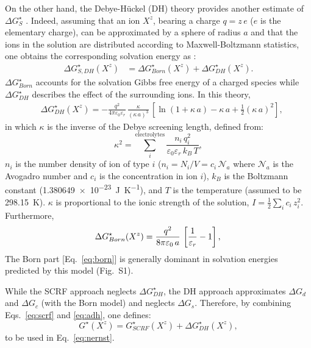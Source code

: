 \documentclass[review,preprint]{elsarticle}
\begin{document}
On the other hand, the Debye-Hückel (DH) theory provides another estimate of $\Delta G_{S}^\star$ \cite{bockrisModernElectrochemistryIonics1998}. Indeed, assuming that an ion $X^z$, bearing a charge $q = z\,e$ ($e$ is the elementary charge), can be approximated by a sphere of radius $a$ and that the ions in the solution are distributed according to Maxwell-Boltzmann statistics, one obtains the corresponding solvation energy as \cite{kontogeorgisDebyeHuckelTheoryIts2018,silvaTrueHuckelEquation2022,silvaImprovingBornEquation2024}:\begin{align}
	\Delta G^\star_{S,DH}(X^z)
	&= \Delta G^\star_{Born}(X^z) + \Delta G^\star_{DH}(X^z).\label{eq:adh}
\end{align}
$\Delta G^\star_{Born}$ accounts for the solvation Gibbs free energy of a charged species while $ \Delta G^\star_{DH}$ describes the effect of the surrounding ions. In this theory,
\begin{align}
	&\Delta G^\star_{DH}(X^z) = -\frac{q^2}{4\pi\varepsilon_0\varepsilon_r}\,\frac{\kappa}{(\kappa\,a)^3}\,\left[\ln(1+\kappa\,a)-\kappa\,a+\frac{1}{2}(\kappa\,a)^2\right],\label{eq:dh} \end{align}
in which $\kappa$ is the inverse of the Debye screening length, defined from:\begin{equation}
	\kappa^2 = \sum_i^{\text{electrolytes}} \frac{n_i\,q_i^2}{\varepsilon_0\varepsilon_r\,k_B\,T}, \label{eq:kappa2}
\end{equation}
$n_i$ is the number density of ion of type $i$ ($n_i = N_i / V = c_i\,\mathcal{N}_a$ where $\mathcal{N}_a$ is the Avogadro number and $c_i$ is the concentration in ion $i$), $k_B$ is the Boltzmann constant (\SI{1.380649e-23}{\joule\per\kelvin}), and $T$ is the temperature (assumed to be \SI{298.15}{\kelvin}).  $\kappa$ is  proportional to the ionic strength of the solution, $I = \frac{1}{2}\sum_i c_i\,z_i^2$. 
Furthermore,
\begin{equation}
	\Delta G^\star_{Born}(X^z) =\frac{q^2}{8\pi\varepsilon_0\,a}\,\left[\frac{1}{\varepsilon_r}-1\right], \label{eq:born}\\
\end{equation}
The Born part [Eq.~\eqref{eq:born}] is generally dominant in solvation energies predicted by this model (Fig.~S1).

While the SCRF approach neglects $\Delta G^\star_{DH}$, the DH approach approximates $\Delta G_{d}$ and $\Delta G_{c}$ (with the Born model) and neglects $\Delta G_{s}$. Therefore, by combining Eqs.~\eqref{eq:scrf} and \eqref{eq:adh}, one defines:\begin{equation}
	G^\star(X^z) = G^\star_{SCRF}(X^z) + \Delta G^\star_{DH}(X^z), \label{eq:gtot}
\end{equation}
to be used in Eq.~\eqref{eq:nernst}.
\end{document}
